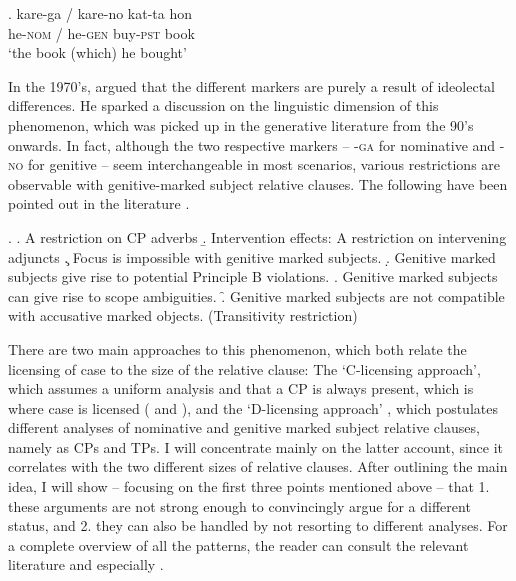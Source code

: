 \documentclass [output=book,colorlinks,citecolor=brown]{langscibook}
\begin{document}
 \exg. kare-ga / kare-no kat-ta hon\\
he-\textsc{nom} / he-\textsc{gen} buy-\textsc{pst} book\\
`the book (which) he bought' \label{no-ga}

In the 1970's, \citet{harada:1971:ga} argued that the different markers are purely a result of ideolectal differences. He sparked a discussion on the linguistic dimension of this phenomenon, which was picked up in the generative literature from the 90's onwards. In fact, although the two respective markers -- -\textsc{ga} for nominative and -\textsc{no} for genitive -- seem interchangeable in most scenarios, various restrictions are observable with genitive-marked subject relative clauses. The following have been pointed out in the literature \citep{watanabe:1996:nominative, hiraiwa:2001:on, miyagawa:2011:genitive, miyagawa:2012:case, miyagawa:2017:agreement, ochi:2004:ga, ochi:2017:ga, ochi:2021:feature, akaso:2011:on, nambu:2014:an, nambu:2023:experimental}. %

\ex. \a. A restriction on CP adverbs
\b. Intervention effects: A restriction on intervening adjuncts
\c. Focus is impossible with genitive marked subjects.
\d. Genitive marked subjects give rise to potential Principle B violations.
\e. Genitive marked subjects can give rise to scope ambiguities.
\f. Genitive marked subjects are not compatible with accusative marked objects. (Transitivity restriction)

There are two main approaches to this phenomenon, which both relate the licensing of case to the size of the relative clause: The `C-licensing approach’, which assumes a uniform analysis and that a CP is always present, which is where case is licensed (\citealt{watanabe:1996:nominative} and \citealt{hiraiwa:2001:multiple, hiraiwa:2001:on}), and the `D-licensing approach' \citep{miyagawa:2011:genitive, miyagawa:2012:case, miyagawa:2017:agreement}, which postulates different analyses of nominative and genitive marked subject relative clauses, namely as CPs and TPs. I will concentrate mainly on the latter account, since it correlates with the two different sizes of relative clauses. After outlining the main idea, I will show -- focusing on the first three points mentioned above -- that 1. these arguments are not strong enough to convincingly argue for a different status, and 2. they can also be handled by not resorting to different analyses. For a complete overview of all the patterns, the reader can consult the relevant literature and especially \citet{ochi:2017:ga}.
\end{document}
